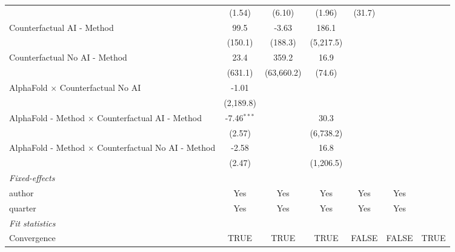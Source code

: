 \begin{tabular}{lcccccc}
                                                              & (1.54)        & (6.10)     & (1.96)    & (31.7)         &               &   \\   
   Counterfactual AI - Method                                 & 99.5          & -3.63      & 186.1     &                &               &   \\   
                                                              & (150.1)       & (188.3)    & (5,217.5) &                &               &   \\   
   Counterfactual No AI - Method                              & 23.4          & 359.2      & 16.9      &                &               &   \\   
                                                              & (631.1)       & (63,660.2) & (74.6)    &                &               &   \\   
   AlphaFold $\times$ Counterfactual No AI                    & -1.01         &            &           &                &               &   \\   
                                                              & (2,189.8)     &            &           &                &               &   \\   
   AlphaFold - Method $\times$ Counterfactual AI - Method     & -7.46$^{***}$ &            & 30.3      &                &               &   \\   
                                                              & (2.57)        &            & (6,738.2) &                &               &   \\   
   AlphaFold - Method $\times$ Counterfactual No AI - Method  & -2.58         &            & 16.8      &                &               &   \\   
                                                              & (2.47)        &            & (1,206.5) &                &               &   \\   
   \midrule
   \emph{Fixed-effects}\\
   author                                                     & Yes           & Yes        & Yes       & Yes            & Yes           & \\  
   quarter                                                    & Yes           & Yes        & Yes       & Yes            & Yes           & \\  
   \midrule
   \emph{Fit statistics}\\
   Convergence                                                &TRUE           & TRUE       & TRUE      & FALSE          & FALSE         & TRUE\\  

\end{tabular}

